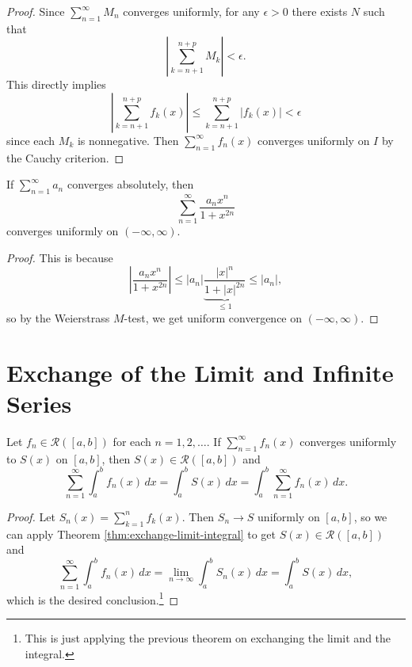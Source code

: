 \begin{proof}
  Since $\sum_{n = 1}^\infty M_n$ converges uniformly,
  for any $\epsilon > 0$ there exists $N$ such that
  \[
    \left| \sum_{k = n + 1}^{n + p} M_k \right| < \epsilon.
  \]
  This directly implies
  \[
    \left| \sum_{k = n + 1}^{n + p} f_k(x) \right|
    \le \sum_{k = n + 1}^{n + p} |f_k(x)|
    < \epsilon
  \]
  since each $M_k$ is nonnegative. Then
  $\sum_{n = 1}^\infty f_n(x)$ converges uniformly on $I$
  by the Cauchy criterion.
\end{proof}

\begin{example}
  If $\sum_{n = 1}^\infty a_n$ converges absolutely,
  then
  \[
    \sum_{n = 1}^\infty \frac{a_n x^n}{1 + x^{2n}}
  \]
  converges uniformly on $(-\infty, \infty)$.
\end{example}

\begin{proof}
  This is because
  \[
    \left| \frac{a_n x^n}{1 + x^{2n}} \right|
    \le |a_n| \underbrace{\frac{|x|^n}{1 + |x|^{2n}}}_{\le 1} \le |a_n|,
  \]
  so by the Weierstrass $M$-test, we get uniform
  convergence on $(-\infty, \infty)$.
\end{proof}

\section{Exchange of the Limit and Infinite Series}

\begin{theorem}
  Let $f_n \in \mathcal{R}([a, b])$ for each $n = 1, 2, \dots$.
  If $\sum_{n = 1}^\infty f_n(x)$ converges uniformly
  to $S(x)$ on $[a, b]$, then $S(x) \in \mathcal{R}([a, b])$ and
  \[
    \sum_{n = 1}^\infty \int_a^b f_n(x) \, dx
    = \int_a^b S(x)\, dx
    = \int_a^b \sum_{n = 1}^\infty f_n(x) \, dx.
  \]
\end{theorem}

\begin{proof}
  Let $S_n(x) = \sum_{k = 1}^n f_k(x)$. Then
  $S_n \to S$ uniformly on $[a, b]$, so we can apply
  Theorem \ref{thm:exchange-limit-integral} to get
  $S(x) \in \mathcal{R}([a, b])$ and
  \[
    \sum_{n = 1}^\infty \int_a^b f_n(x) \, dx
    = \lim_{n \to \infty} \int_a^b S_n(x) \, dx
    = \int_a^b S(x) \, dx,
  \]
  which is the desired conclusion.\footnote{This is just applying the previous theorem on exchanging the limit and the integral.}
\end{proof}

